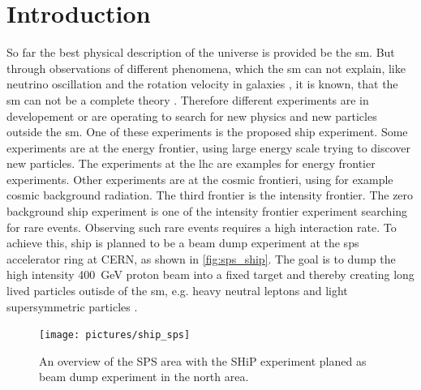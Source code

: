 \chapter{Introduction}



So far the best physical description of the universe is provided be the \ac{sm}.
But through observations of different phenomena, which the \ac{sm} can not explain, like neutrino oscillation \cite{} and the rotation velocity in galaxies \cite{}, it is known, that the \ac{sm} can not be a complete theory \cite{}.
Therefore different experiments are in developement or are operating to search for new physics and new particles outside the \ac{sm}.
One of these experiments is the proposed \ac{ship} experiment.
Some experiments are at the energy frontier, using large energy scale trying to discover new particles. The experiments at the \ac{lhc} are examples for energy frontier experiments.
Other experiments are at the cosmic frontieri, using for example cosmic background radiation.
The third frontier is the intensity frontier.
The zero background \ac{ship} experiment is one of the intensity frontier experiment searching for rare events.
Observing such rare events requires a high interaction rate.
To achieve this, \ac{ship} is planned to be a beam dump experiment at the \ac{sps} accelerator ring at CERN, as shown in \autoref{fig:sps_ship}.
The goal is to dump the high intensity \SI{400}{\giga\electronvolt} proton beam into a fixed target and thereby creating long lived particles outisde of the \ac{sm}, e.g. heavy neutral leptons and light supersymmetric particles \cite{ship}.
\begin{figure}
	\centering
	\texttt{[image: pictures/ship\_sps]}
	\caption[Plan of the SPS area in which SHiP is supposed to be build.]{An overview of the SPS area with the SHiP experiment planed as beam dump experiment in the north area. \cite{ship_facility}}
	\label{fig:sps_ship}
\end{figure}

